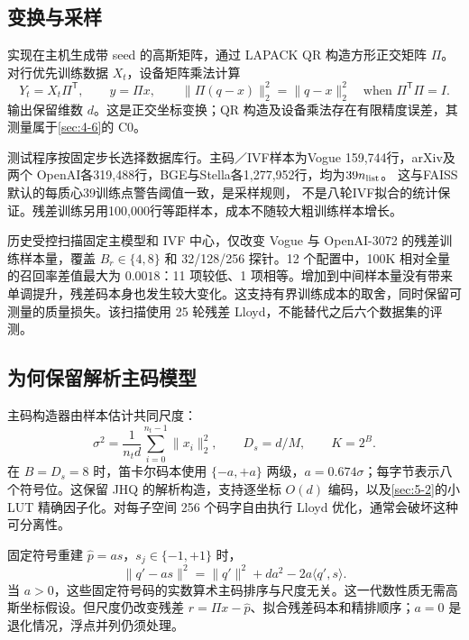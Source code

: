 \subsection{变换与采样}

实现在主机生成带 seed 的高斯矩阵，通过 LAPACK QR 构造方形正交矩阵 $\Pi$。对行优先训练数据 $X_t$，设备矩阵乘法计算
\begin{equation}
 Y_t=X_t\Pi^{\mathsf T},\qquad y=\Pi x,\qquad
 \|\Pi(q-x)\|_2^2=\|q-x\|_2^2
 \quad\text{when }\Pi^{\mathsf T}\Pi=I.
 \label{eq:4-transform}
\end{equation}
输出保留维数 $d$。这是正交坐标变换；QR 构造及设备乘法存在有限精度误差，其测量属于\cref{sec:4-6}的 C0。

测试程序按固定步长选择数据库行。主码／IVF样本为Vogue 159,744行，arXiv及两个
OpenAI各319,488行，BGE与Stella各1,277,952行，均为$39n_{\rm list}$。
这与FAISS默认的每质心39训练点警告阈值一致\cite{faiss_clustering}，是采样规则，
不是八轮IVF拟合的统计保证。残差训练另用100,000行等距样本，成本不随较大粗训练样本增长。

历史受控扫描固定主模型和 IVF 中心，仅改变 Vogue 与 OpenAI-3072 的残差训练样本量，覆盖 $B_r\in\{4,8\}$ 和 32/128/256 探针。12 个配置中，100K 相对全量的召回率差值最大为 $0.0018$：11 项较低、1 项相等。增加到中间样本量没有带来单调提升，残差码本身也发生较大变化。这支持有界训练成本的取舍，同时保留可测量的质量损失。该扫描使用 25 轮残差 Lloyd，不能替代之后六个数据集的评测。

\subsection{为何保留解析主码模型}

主码构造器由样本估计共同尺度：
\begin{equation}
 \sigma^2=\frac{1}{n_t d}\sum_{i=0}^{n_t-1}\|x_i\|_2^2,
 \qquad D_s=d/M,\qquad K=2^B.
 \label{eq:4-scale}
\end{equation}
在 $B=D_s=8$ 时，笛卡尔码本使用 $\{-a,+a\}$ 两级，$a=0.674\sigma$；每字节表示八个符号位。这保留 JHQ 的解析构造\cite{jhq}，支持逐坐标 $O(d)$ 编码，以及\cref{sec:5-2}的小 LUT 精确因子化。对每子空间 256 个码字自由执行 Lloyd 优化，通常会破坏这种可分离性。

固定符号重建 $\widehat p=a s$，$s_j\in\{-1,+1\}$ 时，
\begin{equation}
 \|q'-a s\|^2=\|q'\|^2+da^2-2a\langle q',s\rangle.
 \label{eq:4-sign-ranking}
\end{equation}
当 $a>0$，这些固定符号码的实数算术主码排序与尺度无关。这一代数性质无需高斯坐标假设。但尺度仍改变残差 $r=\Pi x-\widehat p$、拟合残差码本和精排顺序；$a=0$ 是退化情况，浮点并列仍须处理。

